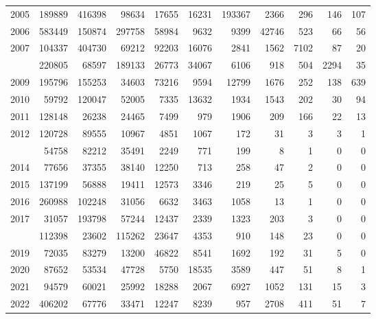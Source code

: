 \documentclass[
]{article}
\begin{document}
\begin{longtable}[t]{lrrrrrrrrrr}
2005 & 189889 & 416398 & 98634 & 17655 & 16231 & 193367 & 2366 & 296 & 146 & 107\\
2006 & 583449 & 150874 & 297758 & 58984 & 9632 & 9399 & 42746 & 523 & 66 & 56\\
2007 & 104337 & 404730 & 69212 & 92203 & 16076 & 2841 & 1562 & 7102 & 87 & 20\\
\addlinespace
2008 & 220805 & 68597 & 189133 & 26773 & 34067 & 6106 & 918 & 504 & 2294 & 35\\
2009 & 195796 & 155253 & 34603 & 73216 & 9594 & 12799 & 1676 & 252 & 138 & 639\\
2010 & 59792 & 120047 & 52005 & 7335 & 13632 & 1934 & 1543 & 202 & 30 & 94\\
2011 & 128148 & 26238 & 24465 & 7499 & 979 & 1906 & 209 & 166 & 22 & 13\\
2012 & 120728 & 89555 & 10967 & 4851 & 1067 & 172 & 31 & 3 & 3 & 1\\
\addlinespace
2013 & 54758 & 82212 & 35491 & 2249 & 771 & 199 & 8 & 1 & 0 & 0\\
2014 & 77656 & 37355 & 38140 & 12250 & 713 & 258 & 47 & 2 & 0 & 0\\
2015 & 137199 & 56888 & 19411 & 12573 & 3346 & 219 & 25 & 5 & 0 & 0\\
2016 & 260988 & 102248 & 31056 & 6632 & 3463 & 1058 & 13 & 1 & 0 & 0\\
2017 & 31057 & 193798 & 57244 & 12437 & 2339 & 1323 & 203 & 3 & 0 & 0\\
\addlinespace
2018 & 112398 & 23602 & 115262 & 23647 & 4353 & 910 & 148 & 23 & 0 & 0\\
2019 & 72035 & 83279 & 13200 & 46822 & 8541 & 1692 & 192 & 31 & 5 & 0\\
2020 & 87652 & 53534 & 47728 & 5750 & 18535 & 3589 & 447 & 51 & 8 & 1\\
2021 & 94579 & 60021 & 25992 & 18288 & 2067 & 6927 & 1052 & 131 & 15 & 3\\
2022 & 406202 & 67776 & 33471 & 12247 & 8239 & 957 & 2708 & 411 & 51 & 7\\*
\end{longtable}
\end{document}
